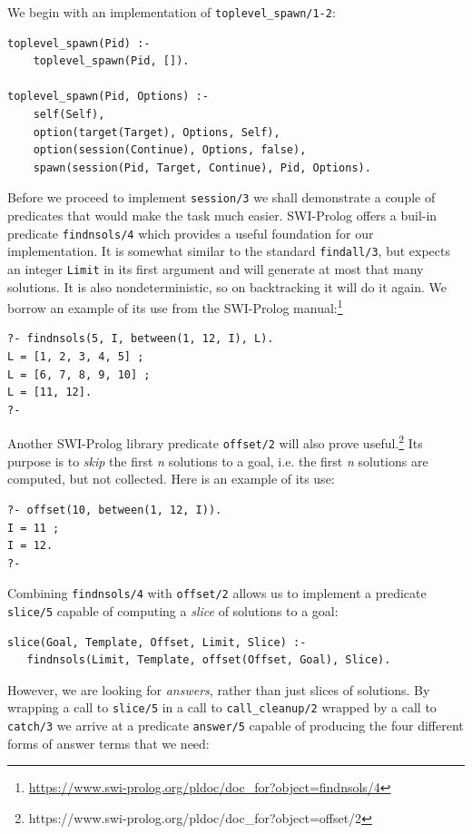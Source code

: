 We begin with an implementation of \texttt{toplevel\_spawn/1-2}:

\begin{verbatim}
toplevel_spawn(Pid) :-
    toplevel_spawn(Pid, []).

toplevel_spawn(Pid, Options) :-
    self(Self),
    option(target(Target), Options, Self),
    option(session(Continue), Options, false),
    spawn(session(Pid, Target, Continue), Pid, Options).
\end{verbatim}

\noindent Before we proceed to implement \texttt{session/3} we shall demonstrate a couple of predicates that would make the task much easier. SWI-Prolog offers a buil-in predicate \texttt{findnsols/4} which provides a useful foundation for our implementation. It is somewhat similar to the standard \texttt{findall/3}, but expects an integer \texttt{Limit} in its first argument and will generate at most that many solutions. It is also nondeterministic, so on backtracking it will do it again. We borrow an example of its use from the SWI-Prolog manual:\footnote{\url{https://www.swi-prolog.org/pldoc/doc\_for?object=findnsols/4}}

\begin{verbatim}
?- findnsols(5, I, between(1, 12, I), L).
L = [1, 2, 3, 4, 5] ;
L = [6, 7, 8, 9, 10] ;
L = [11, 12].
?-
\end{verbatim}

\noindent Another SWI-Prolog library predicate \texttt{offset/2} will also prove useful.\footnote{https://www.swi-prolog.org/pldoc/doc\_for?object=offset/2} Its purpose is to \textit{skip} the first \textit{n} solutions to a goal, i.e. the first \textit{n} solutions are computed, but not collected. Here is an example of its use:

\begin{verbatim}
?- offset(10, between(1, 12, I)).
I = 11 ;
I = 12.
?- 
\end{verbatim}

\noindent Combining \texttt{findnsols/4} with \texttt{offset/2} allows us to implement a predicate \texttt{slice/5} capable of computing a \textit{slice} of solutions to a goal:

\begin{verbatim}
slice(Goal, Template, Offset, Limit, Slice) :-
   findnsols(Limit, Template, offset(Offset, Goal), Slice).
\end{verbatim}

\noindent However, we are looking for \textit{answers}, rather than just slices of solutions. By wrapping a call to \texttt{slice/5} in a call to \texttt{call\_cleanup/2} wrapped by a call to \texttt{catch/3} we arrive at a predicate \texttt{answer/5} capable of producing the four different forms of answer terms that we need:

